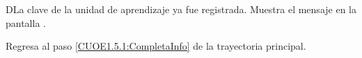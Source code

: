 \begin{UCtrayectoriaA}{D}{La clave de la unidad de aprendizaje ya fue registrada.}
	\UCpaso [\UCsist] Muestra el mensaje  en la pantalla .
	
	\UCpaso Regresa al paso \ref{CUOE1.5.1:CompletaInfo} de la trayectoria principal.
\end{UCtrayectoriaA}


